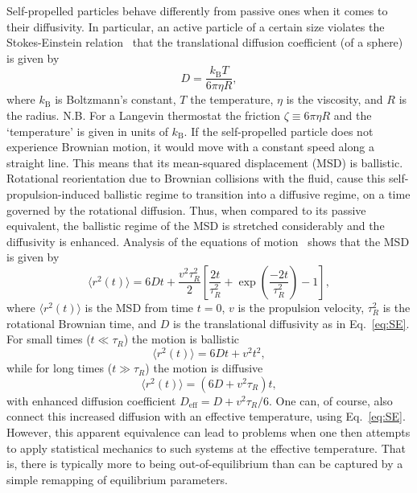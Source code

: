 \documentclass[aip,jcp,reprint,a4paper,onecolumn,amsmath]{revtex4-1}
\begin{document}
Self-propelled particles behave differently from passive ones when it comes to their diffusivity. In particular, an active particle of a certain size violates the Stokes-Einstein relation~\cite{einstein06} that the translational diffusion coefficient (of a sphere) is given by
\begin{equation}
\label{eq:SE} D = \frac{k_{\mathrm{B}}T}{6 \pi \eta R},
\end{equation}
where $k_{\mathrm{B}}$ is Boltzmann's constant, $T$ the temperature, $\eta$ is the viscosity, and $R$ is the radius. N.B. For a Langevin thermostat the friction $\zeta \equiv 6 \pi \eta R$ and the `temperature' is given in units of $k_{\mathrm{B}}$. If the self-propelled particle does not experience Brownian motion, it would move with a constant speed along a straight line. This means that its mean-squared displacement (MSD) is ballistic. Rotational reorientation due to Brownian collisions with the fluid, cause this self-propulsion-induced ballistic regime to transition into a diffusive regime, on a time governed by the rotational diffusion. Thus, when compared to its passive equivalent, the ballistic regime of the MSD is stretched considerably and the diffusivity is enhanced. Analysis of the equations of motion~\cite{Howse_07} shows that the MSD is given by
\begin{equation}
\label{eq:emsd} \langle r^{2}(t) \rangle = 6 D t + \frac{v^{2} \tau^{2}_{R}}{2} \left[ \frac{2 t}{\tau^{2}_{R}} + \exp\left( \frac{-2t}{\tau^{2}_{R}} \right) - 1 \right],
\end{equation}
where $\langle r^{2}(t) \rangle$ is the MSD from time $t=0$, $v$ is the propulsion velocity, $\tau^{2}_{R}$ is the rotational Brownian time, and $D$ is the translational diffusivity as in Eq.~\eqref{eq:SE}. For small times ($t \ll \tau_{R}$) the motion is ballistic
\begin{equation}
\label{eq:bal} \langle r^{2}(t) \rangle = 6 D t + v^{2} t^{2},
\end{equation}
while for long times ($t \gg \tau_{R}$) the motion is diffusive
\begin{equation}
\label{eq:diff} \langle r^{2}(t) \rangle = (6 D + v^{2}\tau_{R}) t,
\end{equation}
with enhanced diffusion coefficient $D_{\mathrm{eff}} = D + v^{2}\tau_{R}/6$. One can, of course, also connect this increased diffusion with an effective temperature, using Eq.~\eqref{eq:SE}. However, this apparent equivalence can lead to problems when one then attempts to apply statistical mechanics to such systems at the effective temperature. That is, there is typically more to being out-of-equilibrium than can be captured by a simple remapping of equilibrium parameters.
\end{document}
